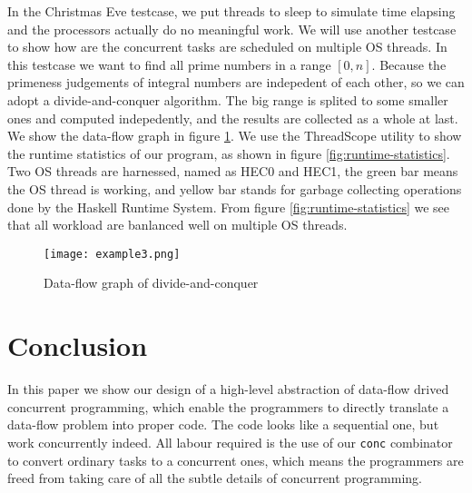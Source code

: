 \documentclass[conference]{IEEEtran}
\begin{document}

In the Christmas Eve testcase, we put threads to sleep to simulate time elapsing and the
processors actually do no meaningful work. We will use another testcase to show how are the concurrent
tasks are scheduled on multiple OS threads. In this testcase we want to find all prime numbers in a range 
$[0, n]$. Because the primeness judgements of integral numbers are indepedent of each other, so we can
adopt a divide-and-conquer algorithm. The big range is splited to some smaller ones and computed
indepedently, and the results are collected as a whole at last. We show the data-flow graph in figure
\ref{fig:divide-and-conquer}. We use the ThreadScope utility to show the runtime statistics of our program, as
shown in figure \ref{fig:runtime-statistics}. Two OS threads are harnessed, named as HEC0 and HEC1,
the green bar means the OS thread is working, and yellow bar stands for garbage collecting operations done
by the Haskell Runtime System. From figure \ref{fig:runtime-statistics} we see that all workload are banlanced
well on multiple OS threads.
\begin{figure}
  \centering
  \texttt{[image: example3.png]}
  \caption{Data-flow graph of divide-and-conquer}
  \label{fig:divide-and-conquer}
\end{figure}
\begin{figure*}[!t]
  \centerline{
    \hfil
  }
  \caption{Runtime statistics of divide-and-conquer}
  \label{fig:runtime-statistics}
\end{figure*}


\section{Conclusion}
In this paper we show our design of a high-level abstraction of data-flow drived concurrent
programming, which enable the programmers to directly translate a data-flow problem into proper
code. The code looks like a sequential one, but work concurrently indeed. All labour required is
the use of our \texttt{conc} combinator to convert ordinary tasks to a concurrent ones, which means
the programmers are freed from taking care of all the subtle details of concurrent programming.
\end{document}
